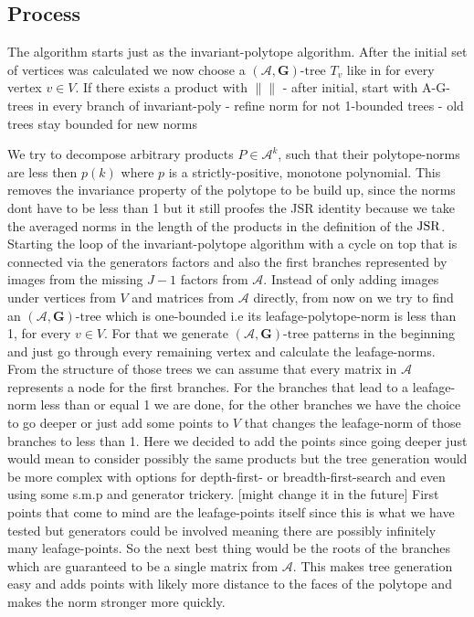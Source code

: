 \subsection{Process}
The algorithm starts just as the invariant-polytope algorithm. After the initial set of vertices was calculated we now choose a
$(\mathcal{A},\mathbf{G})\text{-tree } T_v$ like in \citep{mejstrikHybridApproachJoint2024} for every vertex $v \in V$.
If there exists a product with $ \lVert \rVert$
- after initial, start with A-G-trees in every branch of invariant-poly
- refine norm for not 1-bounded trees
- old trees stay bounded for new norms

We try to decompose arbitrary products $P \in \mathcal{A}^k$, such that their polytope-norms are less then $p(k)$ where $p$ is a strictly-positive, monotone polynomial.
This removes the invariance property of the polytope to be build up, since the norms dont have to be less than 1 but it still proofes the JSR identity because we take the averaged norms in the length of the products in the definition of the $\operatorname{JSR}$.
\newline 
Starting the loop of the invariant-polytope algorithm with a cycle on top that is connected via the generators factors and also the first branches represented by images from the missing $J-1$ factors from $\mathcal{A}$. Instead of only adding images under vertices from $V$ and matrices from $\mathcal{A}$ directly, from now on we try to find an $(\mathcal{A},\mathbf{G})\text{-tree}$ which is one-bounded i.e its leafage-polytope-norm is less than 1, for every $v \in V$.
For that we generate $(\mathcal{A},\mathbf{G})\text{-tree}$ patterns in the beginning and just go through every remaining vertex and calculate the leafage-norms. From the structure of those trees we can assume that every matrix in $\mathcal{A}$ represents a node for the first branches.
For the branches that lead to a leafage-norm less than or equal 1 we are done, for the other branches we have the choice to go deeper or just add some points to $V$ that changes the leafage-norm of those branches to less than 1. Here we decided to add the points since going deeper just would mean to consider possibly the same products but the tree generation would be more complex with options for depth-first- or breadth-first-search and even using some s.m.p and generator trickery. [might change it in the future]
\newline
First points that come to mind are the leafage-points itself since this is what we have tested but generators could be involved meaning there are possibly infinitely many leafage-points. So the next best thing would be the roots of the branches which are guaranteed to be a single matrix from $\mathcal{A}$. This makes tree generation easy and adds points with likely more distance to the faces of the polytope and makes the norm stronger more quickly.
